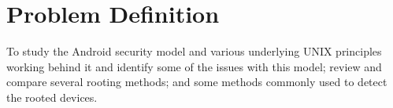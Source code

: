 \chapter{Problem Definition}
To study the Android security model and various underlying UNIX principles working behind it and identify some of the issues with this model; review and compare several rooting methods; and some methods commonly used to detect the rooted devices. 
